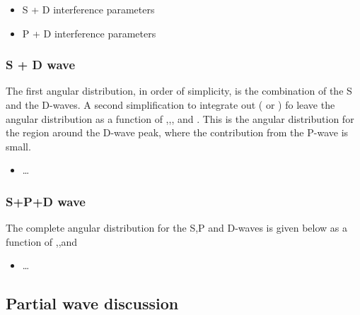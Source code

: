 \begin{itemize}
\item S + D interference parameters
\item P + D interference parameters
\end{itemize}



\subsubsection{S + D wave }

The first angular distribution, in order of simplicity, 
is the combination of the S and the D-waves. 
A second simplification to integrate out \varphi ( or \phiprime )
fo leave the angular distribution as a function of \psq,\qsq,\ctl,  and \ctk.
This is the angular distribution for the region around the D-wave peak, 
where the contribution from the P-wave is small.

\begin{itemize}
\item \dots
\end{itemize}


\subsubsection{S+P+D wave}

The complete angular distribution for the S,P and D-waves is given below as a function of \psq,\qsq,\ctk and \ctl

\begin{itemize}
\item \dots
\end{itemize}



\subsection{Partial wave discussion}



